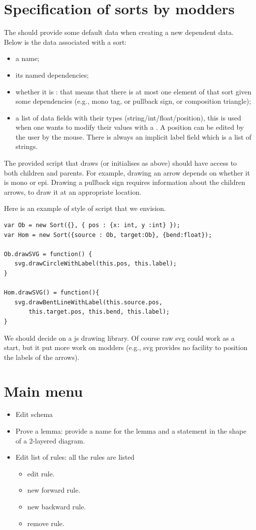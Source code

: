 \documentclass{article}
\begin{document}
\section{Specification of sorts by modders}

The  should provide some default data when creating a new dependent data.
Below is the data associated with a sort:
\begin{itemize}
    \item a name;
    \item its named dependencies;
    \item whether it is  \AP{}: that means that there is at most one element of that sort given some dependencies (e.g., mono tag, or pullback sign, or composition triangle);
    \item a list of data fields with their types (string/int/float/position), this is used when one wants to modify their values with a .
    A position can be edited by the user by the mouse. There is always an implicit label field which is a list of strings.
\end{itemize}


The provided script that draws (or initialises as above) should have access 
to both children and parents. For example, drawing an arrow depends on whether it is mono or epi. Drawing a pullback sign requires information about the children arrows, to draw it at an appropriate location.

Here is an example of style of script that we envision.

\begin{lstlisting}
var Ob = new Sort({}, { pos : {x: int, y :int} });
var Hom = new Sort({source : Ob, target:Ob}, {bend:float});

Ob.drawSVG = function() {
   svg.drawCircleWithLabel(this.pos, this.label);
}

Hom.drawSVG() = function(){
   svg.drawBentLineWithLabel(this.source.pos,
       this.target.pos, this.bend, this.label);
}
\end{lstlisting}
We should decide on a js drawing library. Of course raw svg could work as a start, but it put more work on modders (e.g., svg provides no facility to position the labels of the arrows).
\section{Main menu}
\begin{itemize}
    \item Edit schema
    \item Prove a lemma: provide a name for the lemma and a statement in the shape of a 2-layered diagram.
    \item Edit list of rules: all the rules are listed
    \begin{itemize}
        \item edit rule.
        \item new forward rule.
        \item new backward rule.
        \item remove rule.
    \end{itemize}
\end{itemize}
\end{document}
